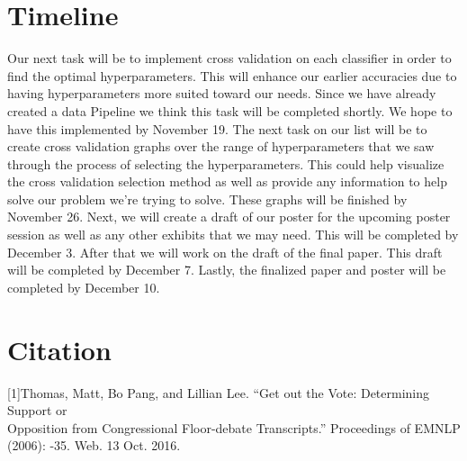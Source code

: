 \documentclass[a4paper, 11pt]{article}
\begin{document}
\section{Timeline}
Our next task will be to implement cross validation on each classifier in order to find the optimal hyperparameters. This will enhance our earlier accuracies due to having hyperparameters more suited toward our needs.  Since we have already created a data Pipeline we think this task will be completed shortly. We hope to have this implemented by November 19. The next task on our list will be to create cross validation graphs over the range of hyperparameters that we saw through the process of selecting the hyperparameters. This could help visualize the cross validation selection method as well as provide any information to help solve our problem we're trying to solve. These graphs will be finished by November 26. Next, we will create a draft of our poster for the upcoming poster session as well as any other exhibits that we may need. This will be completed by December 3. After that we will work on the draft of the final paper. This draft will be completed by December 7. Lastly, the finalized paper and poster will be completed by December 10.

\section{Citation}
[1]Thomas, Matt, Bo Pang, and Lillian Lee. ``Get out the Vote: Determining Support or\\\indent Opposition from Congressional Floor-debate Transcripts.'' Proceedings of EMNLP (2006): -35. Web. 13 Oct. 2016.\\
\end{document}
